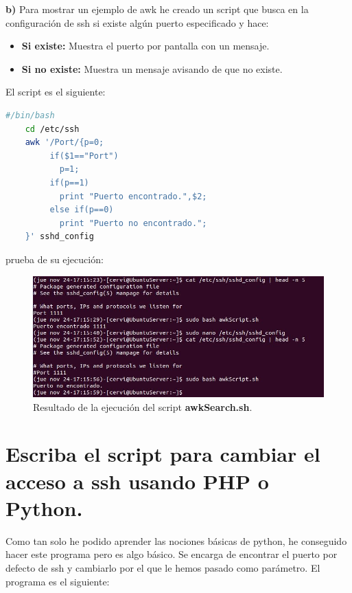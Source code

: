 \textbf{b)} Para mostrar un ejemplo de awk he creado un script que busca en la configuración de ssh si existe algún puerto especificado y hace:
\begin{itemize}
	\item \textbf{Si existe:} Muestra el puerto por pantalla con un mensaje.
	\item \textbf{Si no existe:} Muestra un mensaje avisando de que no existe.
\end{itemize}
El script es el siguiente:
\begin{lstlisting}[language=bash,caption={sed script}]
	#/bin/bash
	cd /etc/ssh
	awk '/Port/{p=0;
		 if($1=="Port")
		   p=1;
		 if(p==1)
		   print "Puerto encontrado.",$2;
		 else if(p==0)
		   print "Puerto no encontrado.";
	}' sshd_config
\end{lstlisting}

prueba de su ejecución: 
\begin{figure}[H]
	\centering
	\includegraphics[scale=0.75]{awk-script.jpg}
	\caption{Resultado de la ejecución del script \textbf{awkSearch.sh}. \label{fig:figura32}}
\end{figure}
\newpage
\section{Escriba el script para cambiar el acceso a ssh usando PHP o Python.}
Como tan solo he podido aprender las nociones básicas de python, he conseguido hacer este programa pero es algo básico. Se encarga de
encontrar el puerto por defecto de ssh y cambiarlo por el que le hemos pasado como parámetro. El programa es el siguiente:

